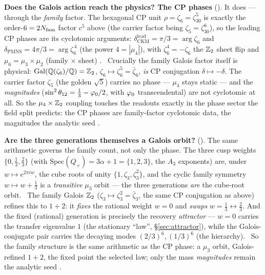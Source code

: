 \par\smallskip\noindent\textbf{Does the Galois action reach the physics? The CP phases}
(). It does --- through the \emph{family} factor. The hexagonal CP unit
$\rho=\zeta_6=\zeta_{30}^5$ is exactly the order-$6=2N_{\mathrm{fam}}$ factor $c^5$ above (the carrier factor being
$\zeta_5=\zeta_{30}^6$), so the leading CP phases are its cyclotomic arguments:
$\delta_{\mathrm{CKM}}^{\mathrm{lead}}=\pi/3=\arg\zeta_6$ and $\delta_{\mathrm{PMNS}}=4\pi/3=\arg\zeta_6^{\,4}$ (the
power $4=|\mu_4|$), with $\zeta_6^4=-\zeta_6$ the $\mathbb Z_2$ sheet flip and $\mu_6=\mu_3\times\mu_2$ (family $\times$
sheet) \mC. \mE\ Crucially the family Galois factor itself is physical: $\mathrm{Gal}(\mathbb Q(\zeta_6)/\mathbb Q)
=\mathbb Z_2$, $\zeta_6\mapsto\zeta_6^5=\bar\zeta_6$, \emph{is} CP conjugation $\delta\mapsto-\delta$. The carrier factor
$\zeta_5$ (the golden $\sqrt5$) carries no phase --- $\mu_4$ stays static --- and the \emph{magnitudes}
($\sin^2\theta_{12}=\tfrac13-\varphi_0/2$, with $\varphi_0$ transcendental) are not cyclotomic at all. So the
$\mu_4\times\mathbb Z_2$ coupling touches the readouts exactly in the phase sector the field split predicts: the CP phases
are family-factor cyclotomic data, the magnitudes the analytic seed \mE.

\par\smallskip\noindent\textbf{Are the three generations themselves a Galois orbit?}
(). The same arithmetic governs the family count, not only the phase. The three cusp
weights $\{0,\tfrac13,\tfrac23\}$ (with $\mathrm{Spec}(Q_+)=3\alpha+1=\{1,2,3\}$, the $A_3$ exponents) are, under
$w\mapsto e^{2\pi i w}$, the cube roots of unity $\{1,\zeta_3,\zeta_3^2\}$, and the cyclic family symmetry
$w\mapsto w+\tfrac13$ is a \emph{transitive} $\mu_3$ orbit --- the three generations \emph{are} the cube-root orbit.
\mE\ The family Galois $\mathbb Z_2$ ($\zeta_3\mapsto\zeta_3^2=\bar\zeta_3$, the same CP conjugation as above) refines this
to $1{+}2$: it \emph{fixes} the rational weight $w=0$ and \emph{swaps} $w=\tfrac13\leftrightarrow\tfrac23$. And the
fixed (rational) generation is precisely the recovery \emph{attractor} --- $w=0$ carries the transfer eigenvalue $1$
(the stationary ``law'', \S\ref{sec:attractor}), while the Galois-conjugate pair carries the decaying modes
$(2/3)^6,(1/3)^6$ (the hierarchy). \mE\ So the family structure is the same arithmetic as the CP phase: a $\mu_3$
orbit, Galois-refined $1{+}2$, the fixed point the selected law; only the mass \emph{magnitudes} remain the analytic
seed \mC.

